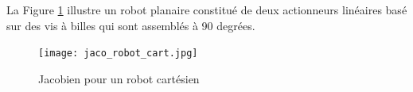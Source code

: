 \newpage


\begin{example}

La Figure \ref{fig:jaco_robot_cart} illustre un robot planaire constitué de deux actionneurs linéaires basé sur des vis à billes qui sont assemblés à 90 degrées. 
\begin{figure}[H]
	\vspace{-5pt}
	\centering
		\texttt{[image: jaco\_robot\_cart.jpg]}
	\caption{Jacobien pour un robot cartésien}
	\vspace{-5pt}
	\label{fig:jaco_robot_cart}
\end{figure}


\end{example}
